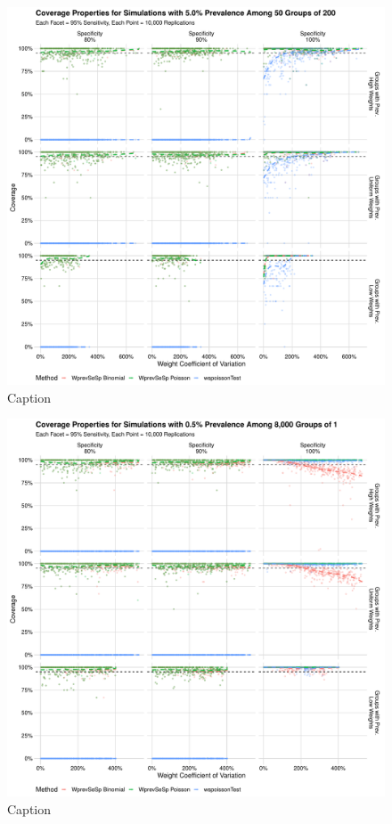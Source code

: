 \documentclass[AMA,STIX1COL]{WileyNJD-v2}
\begin{document}
\begin{figure}
\centering
\includegraphics[width=\textwidth]{figures/imperfect_coverage_50_groups_0_05_prev.pdf}
\caption{Caption}
\label{fig:imperfect_coverage_50_groups_0_05_prev}
\end{figure}

\begin{figure}
\centering
\includegraphics[width=\textwidth]{figures/imperfect_coverage_8000_groups_0_005_prev.pdf}
\caption{Caption}
\label{fig:imperfect_coverage_8000_groups_0_005_prev}
\end{figure}
\end{document}
